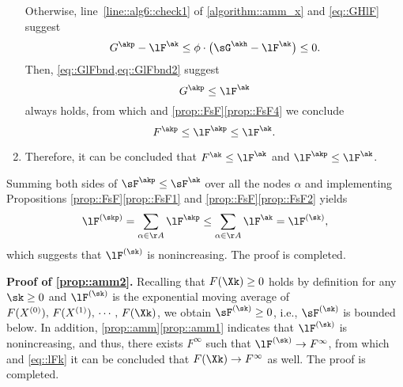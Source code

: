 \begin{enumerate}[leftmargin=0.5cm]
	Otherwise, line~\ref{line::alg6::check1} of \cref{algorithm::amm_x} and \cref{eq::GHlF} suggest
	\begin{equation}\label{eq::GlFbnd}
		G^{\akp} - \lF^{\ak} \leq \phi\cdot \big(\sG^{\akh}-\lF^{\ak}\big)\leq 0.
	\end{equation}
	Then, \cref{eq::GlFbnd,eq::GlFbnd2} suggest
	\begin{equation}\label{eq::GkpFk}
		G^{\akp} \leq \lF^{\ak}
	\end{equation}
	always holds, from which and \cref{prop::FsF}\ref{prop::FsF4} we conclude
	\begin{equation}\label{eq::FlFak}
		F^{\akp}\leq \lF^{\akp}\leq \lF^{\ak}.
	\end{equation}
	\item Therefore, it can be concluded that $F^{\ak}\leq \lF^{\ak}$ and  $\lF^{\akp}\leq \lF^{\ak}$.
\end{enumerate}
Summing both sides of  $\sF^{\akp}\leq \sF^{\ak}$ over all the nodes $\alpha$ and implementing Propositions \ref{prop::FsF}\ref{prop::FsF1} and \ref{prop::FsF}\ref{prop::FsF2} yields
\begin{equation}
	\nonumber
	\lF^{(\skp)}=\sum_{\alpha\in\AA}\lF^{\akp} \leq \sum_{\alpha\in\AA}\lF^{\ak}=\lF^{(\sk)},
\end{equation}
which suggests that $\lF^{(\sk)}$ is nonincreasing. The proof is completed.


\vspace{0.8em}
\noindent\textbf{Proof of \ref{prop::amm2}.\;} Recalling that $F(\Xk)\geq 0$ holds  by definition for any $\sk\geq 0$ and $\lF^{(\sk)}$ is the exponential moving average of $F(X^{(0)}),\,F(X^{(1)}),\,\cdots,\, F(\Xk)$, we obtain $\sF^{(\sk)}\geq 0$, i.e., $\sF^{(\sk)}$ is bounded below. In addition, \cref{prop::amm}\ref{prop::amm1} indicates that $\lF^{(\sk)}$ is nonincreasing, and thus, there exists $F^{\infty}$ such that $\lF^{(\sk)}\rightarrow F^{\infty}$, from which and \cref{eq::lFk} it can be concluded that $F(\Xk)\rightarrow F^{\infty}$ as well. The proof is completed.


